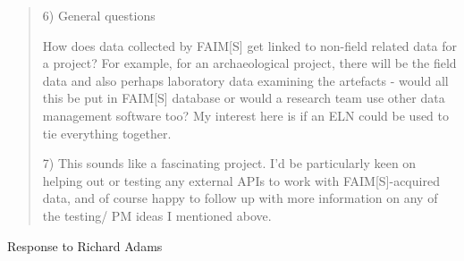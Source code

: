 \documentclass[a4paper,headings=small fontsize=10pt]{scrreprt}
\begin{document}
\begin{quote}
6) General questions

How does data collected by FAIM{[}S{]} get linked to non-field related
data for a project? For example, for an archaeological project, there
will be the field data and also perhaps laboratory data examining the
artefacts - would all this be put in FAIM{[}S{]} database or would a
research team use other data management software too? My interest here
is if an ELN could be used to tie everything together.

7) This sounds like a fascinating project. I'd be particularly keen on
helping out or testing any external APIs to work with
FAIM{[}S{]}-acquired data, and of course happy to follow up with more
information on any of the testing/ PM ideas I mentioned above.
\end{quote}

Response to Richard Adams
\end{document}
